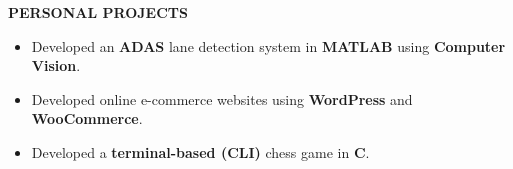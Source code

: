 \documentclass{article}
\begin{document}
\begin{minipage}[t]{0.66\textwidth}
\vspace{2em}
{\color{sectionteal}\large\bfseries PERSONAL PROJECTS} \\[-1.15em]
\begin{itemize}[leftmargin=*, label={-}, itemsep=0.15em, topsep=0pt, parsep=0pt]
\item Developed an \textbf{ADAS} lane detection system in \textbf{MATLAB} using \textbf{Computer Vision}.
\item Developed online e-commerce websites using \textbf{WordPress} and \textbf{WooCommerce}.
\item Developed a \textbf{terminal-based (CLI)} chess game in \textbf{C}.
\end{itemize}

\end{minipage}
\end{document}
